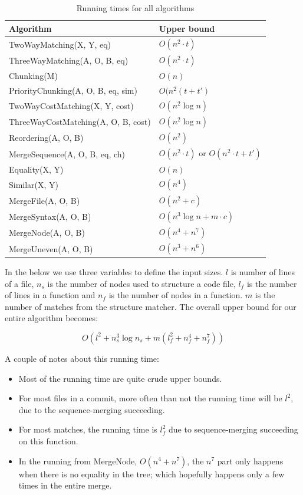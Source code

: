 \documentclass[11pt]{article}
\begin{document}
\begin{table}
\begin{tabular}{l | l  }
\textbf{Algorithm} & \textbf{Upper bound} \\ \hline
TwoWayMatching(X, Y, eq) & $O(n^2 \cdot t)$ \\
ThreeWayMatching(A, O, B, eq) & $O(n^2 \cdot t)$ \\
Chunking(M) & $O(n)$ \\
PriorityChunking(A, O, B, eq, sim) & $O(n^2(t + t')$ \\
TwoWayCostMatching(X, Y, cost) & $O(n^2 \log n)$ \\
ThreeWayCostMatching(A, O, B, cost) & $O(n^2 \log n)$ \\
Reordering(A, O, B) & $O(n^2)$ \\

MergeSequence(A, O, B, eq, ch) & $O(n^2 \cdot t)$  or  $O(n^2 \cdot t +  t')$ \\

Equality(X, Y) & $O(n)$ \\
Similar(X, Y) & $O(n^4)$ \\


MergeFile(A, O, B) & $O(n^2 + c)$ \\
MergeSyntax(A, O, B) & $O(n^3 \log n + m \cdot c)$ \\
MergeNode(A, O, B) & $O(n^4 + n^7)$ \\
MergeUneven(A, O, B) & $O(n^3 + n^6)$ \\
\end{tabular}
\caption{Running times for all algorithms}
\label{RunningTimeTable}
\end{table}

In the below we use three variables to define the input sizes. $l$ is number of lines of a file, $n_s$ is the number of nodes used to structure a code file, $l_f$ is the number of lines in a function and $n_f$ is the number of nodes in a function. $m$ is the number of matches from the structure matcher. The overall upper bound for our entire algorithm becomes:

\begin{equation}
O(l^2 + n_s^3 \log n_s + m ( l_{f}^2 + n_{f}^4 + n_{f}^7)) \nonumber
\end{equation}

A couple of notes about this running time:

\begin{itemize}
	\item Most of the running time are quite crude upper bounds.
	\item For most files in a commit, more often than not the running time will be $l^2$, due to the sequence-merging succeeding.
	\item For most matches, the running time is $l_f^2$ due to sequence-merging succeeding on this function.
	\item In the running from MergeNode, $O(n^4 + n^7)$, the $n^7$ part only happens when there is no equality in the tree; which hopefully happens only a few times in the entire merge.
\end{itemize}
\end{document}
